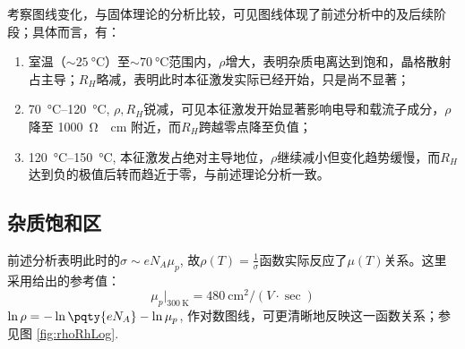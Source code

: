 \documentclass[aps,pre,12pt,preprint,%
	onecolumn,showpacs,showkeys,nofootinbib]{revtex4-1}
\begin{document}
	考察图线变化，与固体理论的分析比较，可见图线体现了前述分析中的及后续阶段；具体而言，有：
	\begin{enumerate}[labelindent=\parindent,leftmargin=0pt,align=left]
	\item[$\tup{b.}\to \tup{c.}$] 室温（$\sim\SI{25}{\celsius}$）至$\sim \SI{70}{\celsius}$范围内，$\rho$增大，表明杂质电离达到饱和，晶格散射占主导；$R_H$略减，表明此时本征激发实际已经开始，只是尚不显著；
	\item[c.] \SIrange{70}{120}{\celsius}, $\rho,R_H$锐减，可见本征激发开始显著影响电导和载流子成分，$\rho$降至 \SI{1000}{\ohm\cdot\cm} 附近，而$R_H$跨越零点降至负值；
	\item[d.] \SIrange{120}{150}{\celsius}, 本征激发占绝对主导地位，$\rho$继续减小但变化趋势缓慢，而$R_H$达到负的极值后转而趋近于零，与前述理论分析一致。
	\end{enumerate}
\subsection{杂质饱和区}
	前述分析表明此时的$\sigma \sim eN_A\mu_p$, 故$\rho(T) = \frac{1}{\sigma}$函数实际反应了$\mu(T)$关系。这里采用\cite{textbook}给出的参考值：
	\[ \mu_p|_{\SI{300}{\K}} = \SI{480}{\cm^2/(V\cdot\sec)} \]
	$\ln\rho = - \ln\pqty{eN_A} - \ln\mu_p$, 
	作对数图线，可更清晰地反映这一函数关系；参见图 \ref{fig:rhoRhLog}. 
	
\end{document}
